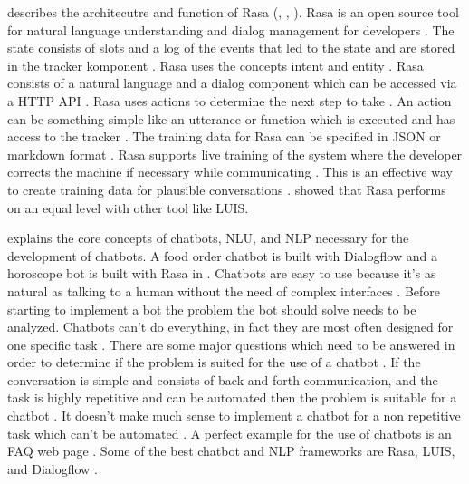 \documentclass[12pt, backref]{report}
\begin{document}
\citet{rasabocklisch2017} describes the architecutre and function of Rasa (\citet{singhbuilding}, \citet{braunEvaluatingNLU}, \citet{buiildChatbotsPython}).
Rasa is an open source tool for natural language understanding and dialog management for developers \cite{rasabocklisch2017}.
The state consists of slots and a log of the events that led to the state and are stored in the tracker komponent \cite{rasabocklisch2017}. Rasa uses the concepts intent and entity \cite{rasabocklisch2017}. Rasa consists of a natural language and a dialog component which can be accessed via a HTTP API \cite{rasabocklisch2017}.
Rasa uses actions to determine the next step to take \cite{rasabocklisch2017}. An action can be something simple like an utterance or function which is executed and has access to the tracker \cite{rasabocklisch2017}.
The training data for Rasa can be specified in JSON or markdown format \cite{rasabocklisch2017}.
Rasa supports live training of the system where the developer corrects the machine if necessary while communicating \cite{rasabocklisch2017}.
This is an effective way to create training data for plausible conversations \cite{rasabocklisch2017}.
\citet{braunEvaluatingNLU} showed that Rasa performs on an equal level with other tool like LUIS.

\citet{buiildChatbotsPython} explains the core concepts of chatbots, NLU, and NLP necessary for the development of chatbots.
A food order chatbot is built with Dialogflow and a horoscope bot is built with Rasa in \citet{buiildChatbotsPython}.
Chatbots are easy to use because it's as natural as talking to a human without the need of complex interfaces \cite{buiildChatbotsPython}.
Before starting to implement a bot the problem the bot should solve needs to be analyzed.
Chatbots can't do everything, in fact they are most often designed for one specific task \cite{buiildChatbotsPython}.
There are some major questions which need to be answered in order to determine if the problem is suited for the use of a chatbot \cite{buiildChatbotsPython}.
If the conversation is simple and consists of back-and-forth communication, and the task is highly repetitive and can be automated then the problem is suitable for a chatbot \cite{buiildChatbotsPython}.
It doesn't make much sense to implement a chatbot for a non repetitive task which can't be automated \cite{buiildChatbotsPython}.
A perfect example for the use of chatbots is an FAQ web page \cite{buiildChatbotsPython}.
Some of the best chatbot and NLP frameworks are Rasa, LUIS, and Dialogflow \cite{buiildChatbotsPython}.
\end{document}
